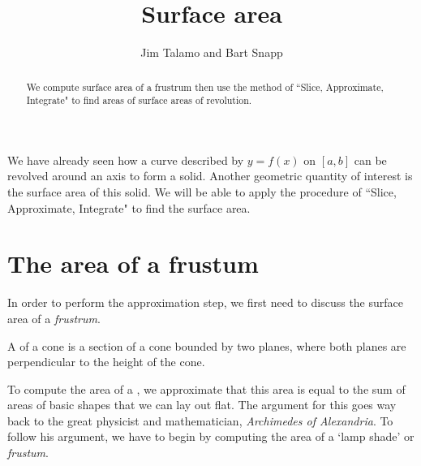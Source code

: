 \documentclass{ximera}
\author{Jim Talamo and Bart Snapp}
\title[Dig-In:]{Surface area}
\begin{document}
\begin{abstract}
We compute surface area of a frustrum then use the method of ``Slice, Approximate, Integrate" to find areas of surface areas of revolution.
\end{abstract}
\maketitle


We have already seen how a curve described by $y=f(x)$ on $[a,b]$ can be revolved around an axis to form a solid. Another geometric quantity of interest is the surface area of this solid.  We will be able to apply the procedure of ``Slice, Approximate, Integrate" to find the surface area. 
\section{The area of a frustum}
 In order to perform the approximation step, we first need to discuss the surface area of a \emph{frustrum}.

\begin{definition}
  A  of a cone is a section of a cone bounded by two
  planes, where both planes are perpendicular to the height of the
  cone.


To compute the area of a , we approximate that this area is equal to the sum of areas of basic shapes  that we can lay out flat. The argument for this goes way back to the great physicist and mathematician, \textit{Archimedes of Alexandria}. To follow his argument, we have to begin by computing the area of a `lamp shade' or \textit{frustum}.

  \begin{image}[1in]
  \end{image}
\end{definition}
\end{document}
